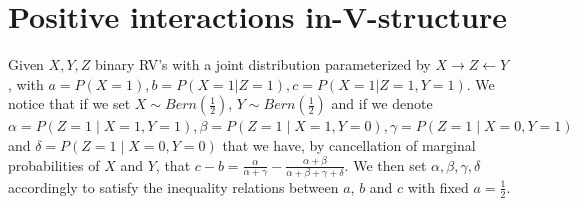 \documentclass[paper=a4, fontsize=11pt]{scrartcl} %
\numberwithin{equation}{section} %
\numberwithin{figure}{section} %
\numberwithin{table}{section} %
\begin{document}
\section{Positive interactions in-V-structure}
Given \(X,Y,Z\) binary RV's with a joint distribution parameterized by $X \rightarrow Z \leftarrow Y$, with $a=P(X=1), b=P(X=1|Z=1), c=P(X=1|Z=1,Y=1)$.
We notice that if we set $X \sim Bern\left(\frac{1}{2}\right)$, $Y \sim Bern\left(\frac{1}{2}\right)$ and if we denote $\alpha=P(Z=1\mid X=1,Y=1), \beta=P(Z=1\mid X=1,Y=0), \gamma=P(Z=1\mid X=0,Y=1)$ and $\delta = P(Z=1\mid X=0,Y=0)$ that we have, by cancellation of marginal probabilities of $X$ and $Y$, that $c-b = \frac{\alpha}{\alpha + \gamma} - \frac{\alpha + \beta}{\alpha + \beta + \gamma + \delta}$. We then set $\alpha, \beta, \gamma, \delta$ accordingly to satisfy the inequality relations between $a$, $b$ and $c$ with fixed $a=\frac{1}{2}$.
\end{document}
